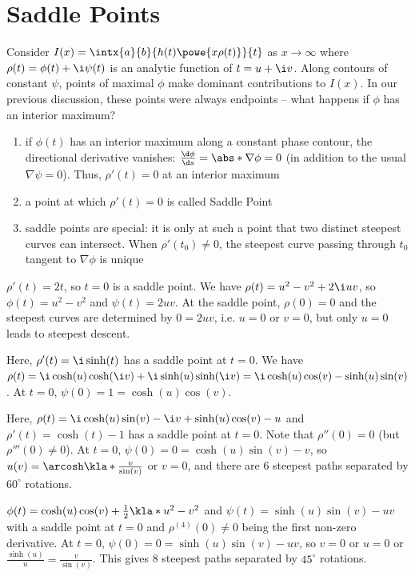 \documentclass[english, parskip=full]{scrbook}
\newcommand{\example}[3]{\begin{tcolorbox}[colback=colorbackgroundexample,colframe=colorexample, breakable,enhanced,title={\textbf{#1}: #2.}]#3\end{tcolorbox}}
\begin{document}
\section{Saddle Points}
Consider $I(x) = \intx{a}{b}{h(t) \powe{x\rho(t)}}{t}$ as $x\rightarrow\infty$ where $\rho(t) = \phi(t) + \i\psi(t)$ is an analytic function of $t=u+\i v$.
Along contours of constant $\psi$, points of maximal $\phi$ make dominant contributions to $I(x)$.
In our previous discussion, these points were always endpoints -- what happens if $\phi$ has an interior maximum?
\begin{enumerate}
\item if $\phi(t)$ has an interior maximum along a constant phase contour, the directional derivative vanishes: $\frac{\d \phi}{\d s} = \abs*{\nabla\phi}=0$ (in addition to the usual $\nabla\psi=0$). Thus, $\rho'(t)=0$ at an interior maximum
\item a point at which $\rho'(t)=0$ is called Saddle Point
\item saddle points are special: it is only at such a point that two distinct steepest curves can intersect. When $\rho'(t_0)\neq 0$, the steepest curve passing through $t_0$ tangent to $\nabla\phi$ is unique
\end{enumerate}
\example{Gaussian}{$\rho(t)=t^2$}{$\rho'(t)=2t$, so $t=0$ is a saddle point.
We have $\rho(t)=u^2-v^2+2\i uv$, so $\phi(t)=u^2-v^2$ and $\psi(t)=2uv$.
At the saddle point, $\rho(0)=0$ and the steepest curves are determined by $0=2uv$, i.e. $u=0$ or $v=0$, but only $u=0$ leads to steepest descent.
}
\example{Hyperbolic}{$\rho(t)=\i\cosh(t)$}{Here, $\rho'(t)=\i \sinh(t)$ has a saddle point at $t=0$.
We have $\rho(t) = \i \cosh(u)\cosh(\i v) + \i \sinh(u)\sinh(\i v) = \i \cosh(u) \cos(v) - \sinh(u)\sin(v)$.
At $t=0$, $\psi(0)=1=\cosh(u)\cos(v)$.
}
\example{Combined Linear}{$\rho(t)=\sinh(t)-t$}{Here, $\rho(t)=\i \cosh(u)\sin(v) - \i v + \sinh(u)\cos(v) - u$ and $\rho'(t)=\cosh(t)-1$ has a saddle point at $t=0$.
Note that $\rho''(0)=0$ (but $\rho'''(0)\neq 0$).
At $t=0$, $\psi(0)=0=\cosh(u)\sin(v)-v$, so $u(v) = \arcosh\kla*{\frac{v}{\sin(v)}}$ or $v=0$, and there are 6 steepest paths separated by $60^\circ$ rotations.
}
\example{Combined Quadratic}{$\rho(t)=\cosh(t) - \frac{1}{2}t^2$}{$\phi(t)=\cosh(u)\cos(v) + \frac{1}{2}\kla*{u^2-v^2}$ and $\psi(t) = \sinh(u)\sin(v) - uv$ with a saddle point at $t=0$ and $\rho^{(4)}(0)\neq 0$ being the first non-zero derivative.
At $t=0$, $\psi(0)=0=\sinh(u)\sin(v)-uv$, so $v=0$ or $u=0$ or $\frac{\sinh(u)}{u} = \frac{v}{\sin(v)}$.
This gives 8 steepest paths separated by $45^\circ$ rotations.
}
\end{document}
